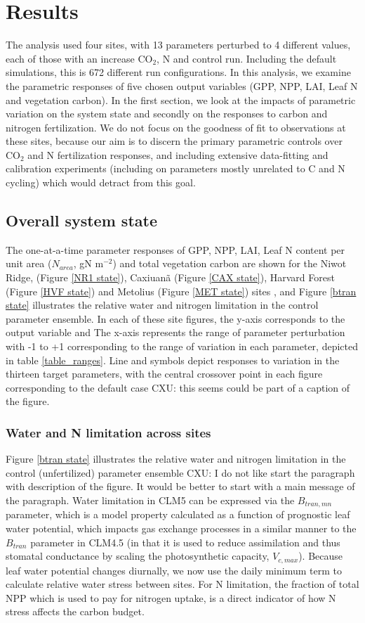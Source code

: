 \documentclass[draft,linenumbers]{agujournal}
\begin{document}
\section{Results}
The analysis used four sites, with 13 parameters perturbed to 4 different values, each of those with an increase CO$_{2}$, N and control run. Including the default simulations, this is 672 different run configurations. In this analysis, we examine the parametric responses of five chosen output variables (GPP, NPP, LAI, Leaf N and vegetation carbon). In the first section, we look at the impacts of parametric variation on the system state and secondly on the responses to carbon and nitrogen fertilization. We do not focus on the goodness of fit to observations at these sites, because our aim is to discern the primary parametric controls over CO$_{2}$ and N fertilization responses, and including extensive data-fitting and calibration experiments (including on parameters mostly unrelated to C and N cycling) which would detract from this goal. 

\subsection{Overall system state}
The one-at-a-time parameter responses of GPP, NPP, LAI, Leaf N content per unit area ($N_{area}$, gN m$^{-2}$) and total vegetation carbon are shown for the Niwot Ridge, (Figure \ref{NR1 state}), Caxiuan\~a (Figure \ref{CAX state}), Harvard Forest (Figure \ref{HVF state}) and Metolius (Figure \ref{MET state}) sites , and Figure \ref{btran state} illustrates the relative water and nitrogen limitation in the control parameter ensemble. In each of these site figures, the y-axis  corresponds to the output variable and The x-axis represents the range of parameter perturbation with -1 to +1 corresponding to the range of variation in each parameter, depicted in table \ref{table_ranges}. Line and symbols depict responses to variation in the thirteen target parameters, with the central crossover point in each figure corresponding to the default case  {CXU: this seems could be part of a caption of the figure}. 
\subsubsection{Water and N limitation across sites}
Figure \ref{btran state} illustrates the relative water and nitrogen limitation in the control (unfertilized) parameter ensemble {CXU: I do not like start the paragraph with description of the figure. It would be better to start with a main message of the paragraph}. Water limitation in CLM5 can be expressed via the $B_{tran,mn}$ parameter, which is a model property calculated as a function of prognostic leaf water potential, which impacts gas exchange processes in a similar manner to the $B_{tran}$ parameter in CLM4.5 (in that it is used to reduce assimilation and thus stomatal conductance by scaling the photosynthetic capacity, $V_{c,max}$). Because leaf water potential changes diurnally, we now use the daily minimum term to calculate relative water stress between sites. For N limitation, the fraction of total NPP which is used to pay for nitrogen uptake, is a direct indicator of how N stress affects the carbon budget.  
\end{document}
